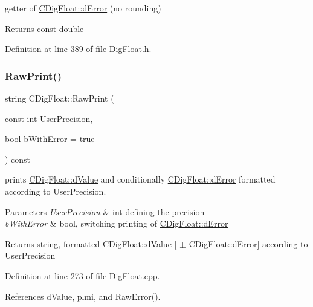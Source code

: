 getter of \hyperlink{classCDigFloat_a25eb3782d1e727ff007a48f8308e3d4d}{C\+Dig\+Float\+::d\+Error} (no rounding) 

\begin{DoxyReturn}{Returns}
const double 
\end{DoxyReturn}


Definition at line 389 of file Dig\+Float.\+h.

\mbox{\label{classCDigFloat_a7051716ffe1294bab6ed6e194a73618e}} 
\subsubsection{\texorpdfstring{Raw\+Print()}{RawPrint()}}
{\footnotesize\ttfamily string C\+Dig\+Float\+::\+Raw\+Print (\begin{DoxyParamCaption}\item[{const int}]{User\+Precision,  }\item[{bool}]{b\+With\+Error = {\ttfamily true} }\end{DoxyParamCaption}) const}



prints \hyperlink{classCDigFloat_a4bbe69e30dd4e20527362493aa9aaf96}{C\+Dig\+Float\+::d\+Value} and conditionally \hyperlink{classCDigFloat_a25eb3782d1e727ff007a48f8308e3d4d}{C\+Dig\+Float\+::d\+Error} formatted according to User\+Precision. 


\begin{DoxyParams}{Parameters}
{\em User\+Precision} & int defining the precision \\
\hline
{\em b\+With\+Error} & bool, switching printing of \hyperlink{classCDigFloat_a25eb3782d1e727ff007a48f8308e3d4d}{C\+Dig\+Float\+::d\+Error} \\
\hline
\end{DoxyParams}
\begin{DoxyReturn}{Returns}
string, formatted \hyperlink{classCDigFloat_a4bbe69e30dd4e20527362493aa9aaf96}{C\+Dig\+Float\+::d\+Value} \mbox{[} $\pm$ \hyperlink{classCDigFloat_a25eb3782d1e727ff007a48f8308e3d4d}{C\+Dig\+Float\+::d\+Error}\mbox{]} according to User\+Precision 
\end{DoxyReturn}


Definition at line 273 of file Dig\+Float.\+cpp.



References d\+Value, plmi, and Raw\+Error().


